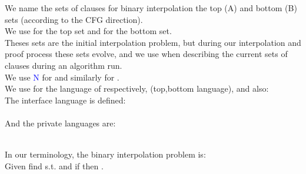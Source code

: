 We name the sets of clauses for binary interpolation the top (A) and bottom (B) sets (according to the CFG direction).\\
We use \m{\textcolor{blue}{N^t_0}} for the top set and \m{\textcolor{blue}{N^b_0}} for the bottom set.\\
Theses sets are the initial interpolation problem, but during our interpolation and proof process these sets evolve,
and we use \m{\textcolor{blue}{N^t},\textcolor{blue}{N^b}} when describing the current sets of clauses during an algorithm run.\\
We use \textcolor{blue}{N} for  and similarly \m{\textcolor{blue}{N_0}} for .\\
We use \m{\textcolor{blue}{\langt},\textcolor{blue}{\langb}} for the language of  respectively, (top,bottom language), and also:\\
The interface language \textcolor{blue}{\langI} is defined:\\
\m{\langI \triangleq \langt \cap \langb}\\
And the private languages are:\\
\m{\textcolor{blue}{\langtp} \triangleq \langt \setminus \langb}\\
\m{\textcolor{blue}{\langbp} \triangleq \langb \setminus \langt}

\bigskip

\noindent
In our terminology, the binary interpolation problem is:\\
Given  find  s.t.  and if  then .


